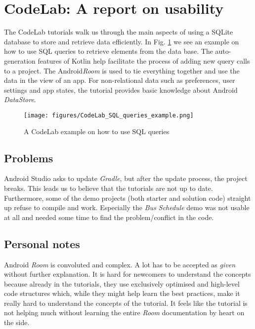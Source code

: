 \section{CodeLab: A report on usability}
The CodeLab tutorials walk us through the main aspects of using a SQLite database to store and retrieve data efficiently.
In Fig. \ref{fig:SQL_queries} we see an example on how to use SQL queries to retrieve elements from the data base.
The auto-generation features of Kotlin help facilitate the process of adding new query calls to a project. 
The Android\textsl{Room} is used to tie everything together and use the data in the view of an app. 
For non-relational data such as preferences, user settings and app states, the tutorial provides basic knowledge about Android \textsl{DataStore}. 
\begin{figure}[h!]
	\texttt{[image: figures/CodeLab\_SQL\_queries\_example.png]}
	\caption{A CodeLab example on how to use SQL queries}
	\label{fig:SQL_queries}
\end{figure}

\subsection*{Problems}
Android Studio asks to update \textsl{Gradle}, but after the update process, the project breaks. This leads us to believe that the tutorials are not up to date.
Furthermore, some of the demo projects (both starter and solution code) straight up refuse to compile and work. Especially the \textsl{Bus Schedule} demo was not usable at all and needed some time to find the problem/conflict in the code.

\subsection*{Personal notes}
Android \textsl{Room} is convoluted and complex. A lot has to be accepted as \textsl{given} without further explanation. It is hard for newcomers to understand the concepts because already in the tutorials, they use exclusively optimised and high-level code structures which, while they might help learn the best practices, make it really hard to understand the concepts of the tutorial.
It feels like the tutorial is not helping much without learning the entire \textsl{Room} documentation by heart on the side.